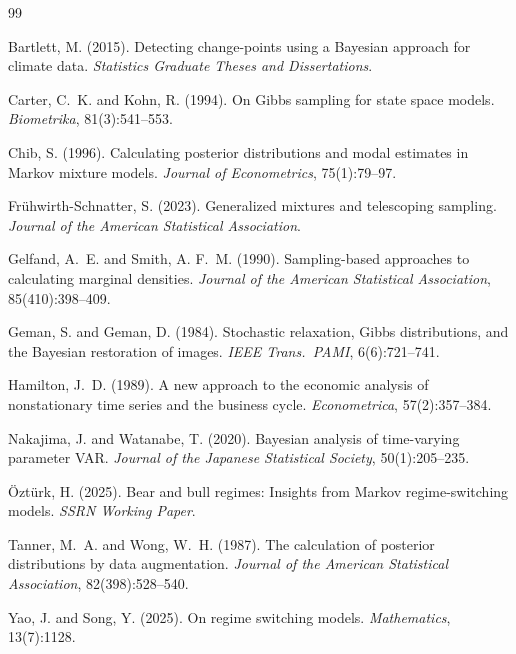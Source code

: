 \documentclass[12pt, a4paper]{article}
\begin{document}

\begin{thebibliography}{99}

Bartlett, M. (2015).
\newblock Detecting change-points using a Bayesian approach for climate data.
\newblock \emph{Statistics Graduate Theses and Dissertations}.

Carter, C.~K. and Kohn, R. (1994).
\newblock On Gibbs sampling for state space models.
\newblock \emph{Biometrika}, 81(3):541--553.

Chib, S. (1996).
\newblock Calculating posterior distributions and modal estimates in Markov
mixture models.
\newblock \emph{Journal of Econometrics}, 75(1):79--97.

Fr\"{u}hwirth-Schnatter, S. (2023).
\newblock Generalized mixtures and telescoping sampling.
\newblock \emph{Journal of the American Statistical Association}.

Gelfand, A.~E. and Smith, A. F.~M. (1990).
\newblock Sampling-based approaches to calculating marginal densities.
\newblock \emph{Journal of the American Statistical Association},
85(410):398--409.

Geman, S. and Geman, D. (1984).
\newblock Stochastic relaxation, Gibbs distributions, and the Bayesian
restoration of images.
\newblock \emph{IEEE Trans.\ PAMI}, 6(6):721--741.

Hamilton, J.~D. (1989).
\newblock A new approach to the economic analysis of nonstationary time series
and the business cycle.
\newblock \emph{Econometrica}, 57(2):357--384.

Nakajima, J. and Watanabe, T. (2020).
\newblock Bayesian analysis of time-varying parameter VAR.
\newblock \emph{Journal of the Japanese Statistical Society}, 50(1):205--235.

\"{O}zt\"{u}rk, H. (2025).
\newblock Bear and bull regimes: Insights from Markov regime-switching models.
\newblock \emph{SSRN Working Paper}.

Tanner, M.~A. and Wong, W.~H. (1987).
\newblock The calculation of posterior distributions by data augmentation.
\newblock \emph{Journal of the American Statistical Association},
82(398):528--540.

Yao, J. and Song, Y. (2025).
\newblock On regime switching models.
\newblock \emph{Mathematics}, 13(7):1128.

\end{thebibliography}
\end{document}
